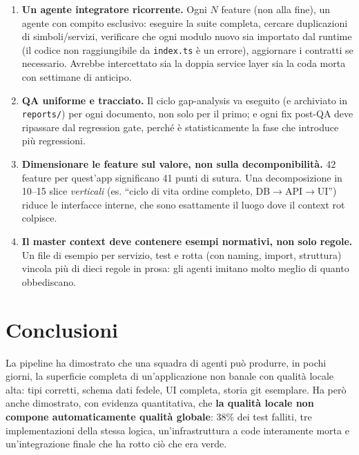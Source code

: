 \documentclass[11pt,a4paper]{article}
\newcommand{\file}[1]{\texttt{\small #1}}
\begin{document}
\begin{enumerate}[leftmargin=1.8em]
  \item \textbf{Un agente integratore ricorrente.} Ogni $N$ feature (non alla fine), un agente con compito esclusivo: eseguire la suite completa, cercare duplicazioni di simboli/servizi, verificare che ogni modulo nuovo sia importato dal runtime (il codice non raggiungibile da \file{index.ts} \`e un errore), aggiornare i contratti se necessario. Avrebbe intercettato sia la doppia service layer sia la coda morta con settimane di anticipo.

  \item \textbf{QA uniforme e tracciato.} Il ciclo gap-analysis va eseguito (e archiviato in \file{reports/}) per ogni documento, non solo per il primo; e ogni fix post-QA deve ripassare dal regression gate, perch\'e \`e statisticamente la fase che introduce pi\`u regressioni.

  \item \textbf{Dimensionare le feature sul valore, non sulla decomponibilit\`a.} 42 feature per quest'app significano 41 punti di sutura. Una decomposizione in 10--15 slice \emph{verticali} (es. ``ciclo di vita ordine completo, DB$\to$API$\to$UI'') riduce le interfacce interne, che sono esattamente il luogo dove il context rot colpisce.

  \item \textbf{Il master context deve contenere esempi normativi, non solo regole.} Un file di esempio per servizio, test e rotta (con naming, import, struttura) vincola pi\`u di dieci regole in prosa: gli agenti imitano molto meglio di quanto obbediscano.
\end{enumerate}

\section{Conclusioni}

La pipeline ha dimostrato che una squadra di agenti pu\`o produrre, in pochi giorni, la superficie completa di un'applicazione non banale con qualit\`a locale alta: tipi corretti, schema dati fedele, UI completa, storia git esemplare. Ha per\`o anche dimostrato, con evidenza quantitativa, che \textbf{la qualit\`a locale non compone automaticamente qualit\`a globale}: 38\% dei test falliti, tre implementazioni della stessa logica, un'infrastruttura a code interamente morta e un'integrazione finale che ha rotto ci\`o che era verde.
\end{document}
